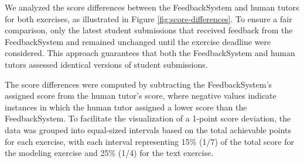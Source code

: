 \documentclass[sigconf,screen,review,anonymous]{acmart}
\begin{document}
We analyzed the score differences between the FeedbackSystem and human tutors for both exercises, as illustrated in Figure \ref{fig:score-differences}.
To ensure a fair comparison, only the latest student submissions that received feedback from the FeedbackSystem and remained unchanged until the exercise deadline were considered.
This approach guarantees that both the FeedbackSystem and human tutors assessed identical versions of student submissions.

The score differences were computed by subtracting the FeedbackSystem's assigned score from the human tutor's score, where negative values indicate instances in which the human tutor assigned a lower score than the FeedbackSystem.
To facilitate the visualization of a 1-point score deviation, the data was grouped into equal-sized intervals based on the total achievable points for each exercise, with each interval representing 15\% (1/7) of the total score for the modeling exercise and 25\% (1/4) for the text exercise.
\end{document}
